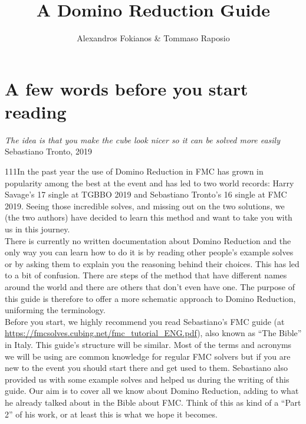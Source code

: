 \documentclass[11pt,a4paper]{book}
\begin{document}
\author{Alexandros Fokianos \& Tommaso Raposio}
\title{A Domino Reduction Guide}


\maketitle 


\section*{A few words before you start reading}

\begin{center}
\textit{The idea is that you make the cube look nicer so it can be solved more easily}\\ 
Sebastiano Tronto, 2019\\
\end{center}
111In the past year the use of Domino Reduction in FMC has grown in popularity among the best at the event and has led to two world records: Harry Savage’s 17 single at TGBBO 2019 and Sebastiano Tronto’s 16 single at FMC 2019. Seeing those incredible solves, and missing out on the two solutions, we (the two authors) have decided to learn this method and want to take you with us in this journey.\\
\newline
There is currently no written documentation about Domino Reduction and the only way you can learn how to do it is by reading other people’s example solves or by asking them to explain you the reasoning behind their choices. This has led to a bit of confusion. There are steps of the method that have different names around the world and there are others that don’t even have one. The purpose of this guide is therefore to offer a more schematic approach to Domino Reduction, uniforming the terminology.\\
\newline
Before you start, we highly recommend you read Sebastiano’s FMC guide (at \url{https://fmcsolves.cubing.net/fmc\_tutorial\_ENG.pdf}), also known as “The Bible” in Italy. This guide's structure will be similar. Most of the terms and acronyms we will be using are common knowledge for regular FMC solvers but if you are new to the event you should start there and get used to them. Sebastiano also provided us with some example solves and helped us during the writing of this guide. Our aim is to cover all we know about Domino Reduction, adding to what he already talked about in the Bible about FMC. Think of this as kind of a “Part 2” of his work, or at least this is what we hope it becomes.\\
\end{document}
